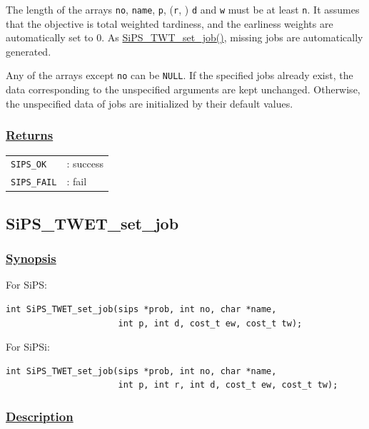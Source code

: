 \documentclass[a4paper]{book}
\begin{document}
\noindent
The length of the arrays \verb+no+, \verb+name+, \verb+p+, (\verb+r+, ) \verb+d+ and \verb+w+ must be at least \verb+n+.
It assumes that the objective is total weighted tardiness, and the earliness weights are automatically set to 0.
As \hyperlink{SiPS_TWT_set_job}{SiPS\_TWT\_set\_job()}, missing jobs are automatically generated.

Any of the arrays except \verb+no+ can be \verb+NULL+.
If the specified jobs already exist, the data corresponding to the unspecified arguments are kept unchanged.
Otherwise, the unspecified data of jobs are initialized by their default values.

\subsubsection{\underline{Returns}}

\begin{tabular}{ll}
  \verb+SIPS_OK+  &: success\\
  \verb+SIPS_FAIL+&: fail\\
\end{tabular}

\hypertarget{SiPS_TWET_set_job}{%
\subsection{SiPS\_TWET\_set\_job}
}

\subsubsection{\underline{Synopsis}}

For SiPS:

\begin{verbatim}
int SiPS_TWET_set_job(sips *prob, int no, char *name,
                      int p, int d, cost_t ew, cost_t tw);
\end{verbatim}

\noindent
For SiPSi:

\begin{verbatim}
int SiPS_TWET_set_job(sips *prob, int no, char *name,
                      int p, int r, int d, cost_t ew, cost_t tw);
\end{verbatim}

\subsubsection{\underline{Description}}
\end{document}
